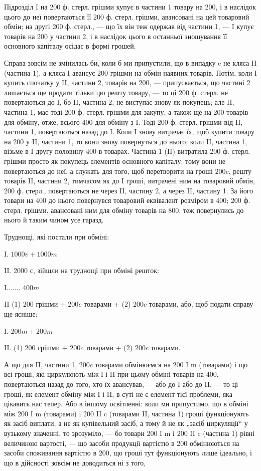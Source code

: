 Підрозділ I на 200 ф. стерл. грішми купує в частини 1 товару на
200, і в наслідок цього до неї повертаються її 200 ф. стерл. грішми,
авансовані на цей товаровий обмін; на другі 200 ф. стерл., — що їх він
теж одержав від частини 1, — I купує товарів на 200 у частини 2, і в
наслідок цього в останньої зношування її основного капіталу осідає в
формі грошей.

Справа зовсім не змінилась би, коли б ми припустили, що в випадку
c не кляса II (частина 1), а кляса I авансує 200 грішми на обмін наявних
товарів. Потім, коли I купить спочатку у II, частини 2, товарів на
200, — припускається, що частині 2 лишається ще продати тільки цю
решту товару, — то ці 200 ф. стерл. не повертаються до I, бо II, частина
2, не виступає знову як покупець; але II, частина 1, має тоді 200 ф. стерл.
грішми для закупу, а також ще на 200 товарів для обміну, отже, всього
400 для обміну з I. Тоді 200 ф. стерл. грішми від    II, частини 1, повертаються
назад до I. Коли I знову витрачає їх, щоб купити    товару на
200 у II, частини 1, то вони знову повернуться до нього, коли II,
частина 1, візьме в I другу половину 400 в товарах. Частина 1 (II)
витратила 200 ф. стерл. грішми просто як покупець елементів основного
капіталу; тому вони не повертаються до неї, а служать для того,
щоб перетворити на гроші $200 c$, решту товарів II, частини 2, тимчасом
як до I гроші, витрачені ним на товаровий обмін, 200 ф. стерл., повертаються
не через II, частину 2, а через II, частину 1. За його товари
на 400 до нього повернувся товаровий еквівалент розміром в 400;
200 ф. стерл. грішми, авансовані ним для обміну товарів на 800, теж
повернулись до нього й таким чином усе гаразд.

Труднощі, які постали при обміні:

I.    $1000 v + 1000 m$

II.    2000 с, зійшли на труднощі при обміні решток:

I....... $400 m$

II (1) 200 грішми + $200 c$ товарами + (2) $200 c$ товарами, або, щоб
подати справу ще ясніше:

I.    $200 m + 200 m$

II. (1) 200 грішми + $200 c$ товарами + (2) $200 c$ товарами.

А що для II, частини 1, $200 c$ товарами обмінюємся на 200 I m
(товарами) і що всі гроші, які циркулюють між І і II при цьому обміні
товарів на 400, повертаються назад до того, хто їх авансував, — або до
I або до II, — то ці гроші, як елемент обміну між I і II, в суті не є
елемент тієї проблеми, яка цікавить нас тепер. Або в іншому освітленні:
коли ми припустимо, що в обміні між 200 I m (товарами) і 200 II c
(товарами II, частина 1) гроші функціонують як засіб виплати, а не як
купівельний засіб, а тому й не як „засіб циркуляції“ у вузькому значенні,
то зрозуміло, — бо товари 200 I m і 200 II c (частина 1)
рівні величиною вартості, — що засоби продукції вартістю в 200 обмінюються
на засоби споживання вартістю в 200, що гроші тут функціонують
лише ідеально, і що в дійсності зовсім не доводиться ні з того,
\parbreak{}  %

